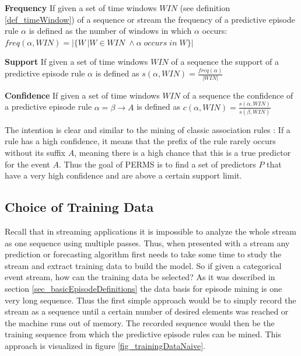 \begin{mydef}
\label{def_frequency}
\textbf{Frequency} If given a set of time windows $WIN$ (see definition \ref{def_timeWindow}) of a sequence or stream the frequency of a predictive episode rule $\alpha$ is defined as the number of windows in which $\alpha$ occurs: $freq(\alpha,WIN) = |\{W\,|W \in WIN\; \land \alpha\; occurs \; in \; W\}|$
\end{mydef}

\begin{mydef}
\label{def_support}
\textbf{Support} If given a set of time windows $WIN$ of a sequence the support of a predictive episode rule $\alpha$ is defined as $s(\alpha,WIN) = \frac{freq(\alpha)}{|WIN|}$
\end{mydef}

\begin{mydef}
\label{def_confidence}
\textbf{Confidence} If given a set of time windows $WIN$ of a sequence the confidence of a predictive episode rule $\alpha = \beta \rightarrow A$ is defined as $c(\alpha,WIN) = \frac{s(\alpha,WIN)}{s(\beta,WIN)}$ \cite{meger2004constraint}
\end{mydef}

The intention is clear and similar to the mining of classic association rules \cite{agrawal1994fast}: If a rule has a high confidence, it means that the prefix of the rule rarely occurs without its suffix $A$, meaning there is a high chance that this is a true predictor for the event $A$. Thus the goal of PERMS is to find a set of predictors $P$ that have a very high confidence and are above a certain support limit.

\subsection{Choice of Training Data}
Recall that in streaming applications it is impossible to analyze the whole stream as one sequence using multiple passes. Thus, when presented with a stream any prediction or forecasting algorithm first needs to take some time to study the stream and extract training data to build the model. So if given a categorical event stream, how can the training data be selected? As it was described in section \ref{sec_basicEpisodeDefinitions} the data basis for episode mining is one very long sequence. Thus the first simple approach would be to simply record the stream as a sequence until a certain number of desired elements was reached or the machine runs out of memory. The recorded sequence would then be the training sequence from which the predictive episode rules can be mined. This approach is visualized in figure \ref{fig_trainingDataNaive}.

